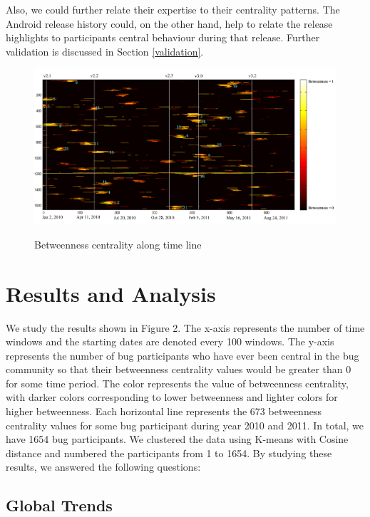 \documentclass[10pt, conference, compsocconf]{IEEEtran}
\begin{document}
Also, we could further relate their expertise to their centrality
patterns. The Android release history could, on the other hand, help
to relate the release highlights to participants central behaviour during
that release. Further validation is discussed in Section
\ref{validation}. 


\begin{figure}[ht]
\centering
\includegraphics[width=18cm]{result.pdf}
\label{result}
\caption{Betweenness centrality along time line}
\end{figure}

\section{Results and Analysis}
\label{results}

We study the results shown in Figure 2. The x-axis represents the
number of time windows and the starting dates are denoted every 100
windows. The y-axis represents the number of bug participants who have
ever been central in the bug community so that their betweenness
centrality values would be greater than 0 for some time period. The
color represents the value of betweenness centrality, with darker
colors corresponding to lower betweenness and lighter colors for
higher betweenness. Each horizontal line represents the 673 betweenness
centrality values for some bug participant during year 2010 and
2011. In total, we have 1654 bug participants. We clustered the data
using K-means with Cosine distance and numbered the participants from
1 to 1654. By studying these results, we answered the
following questions:


\subsection{Global Trends}
\end{document}
